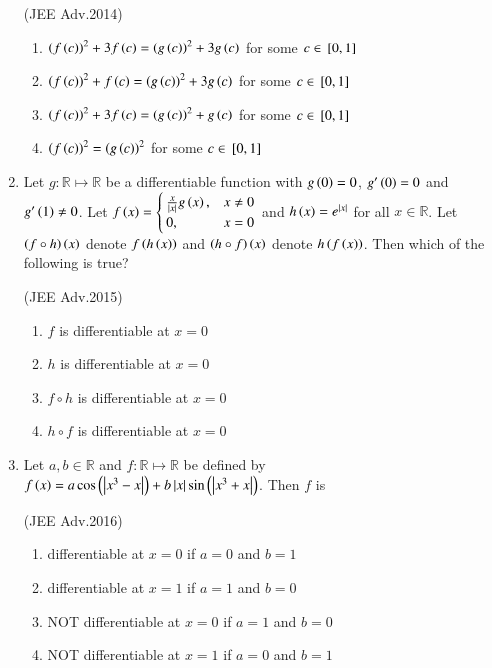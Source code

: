 \documentclass[journal]{IEEEtran}
\numberwithin{equation}{enumi}
\numberwithin{figure}{enumi}
\begin{document}
\begin{enumerate}
    \hfill(JEE Adv.2014)
    
    \begin{enumerate}
        \item ${\left(f\left(c\right)\right)}^2+3f\left(c\right)={\left(g\left(c\right)\right)}^2+3g\left(c\right)$ for some $c\in {}\left[0,1\right]$
        \item ${\left(f\left(c\right)\right)}^2+f\left(c\right)={\left(g\left(c\right)\right)}^2+3g\left(c\right)$ for some $c\in {}\left[0,1\right]$
        \item ${\left(f\left(c\right)\right)}^2+3f\left(c\right)={\left(g\left(c\right)\right)}^2+g\left(c\right)$ for some $c\in {}\left[0,1\right]$
        \item ${\left(f\left(c\right)\right)}^2={\left(g\left(c\right)\right)}^2$ for some $c\in {}\left[0,1\right]$ 
    \end{enumerate}


    \item 
	    Let $g: \mathbb{R}\mapsto \mathbb{R}$ be a differentiable function with $g\left(0\right)=0$, $g^{\prime}\left(0\right)=0$ and $g^{\prime}\left(1\right)\neq 0$. Let $f\left(x\right)=
        \begin{cases}
		\frac{x}{\left\vert x\right\vert}g\left(x\right), & x\neq 0 \\
            0, & x=0
        \end{cases}$ 
	and $h\left(x\right)=e^{\left\vert x\right\vert}$ for all $x\in \mathbb{R}$. Let $\left(f\circ h\right)\left(x\right)$ denote $f\left(h\left(x\right)\right)$ and $\left(h\circ f\right)\left(x\right)$ denote $h\left(f\left(x\right)\right)$. Then which of the following is true? 

    \hfill(JEE Adv.2015)
    
    \begin{enumerate}        
        \item $f$ is differentiable at $x=0$ 
        \item $h$ is differentiable at $x=0$ 
        \item $f\circ h$ is differentiable at $x=0$ 
        \item $h\circ f$ is differentiable at $x=0$  
    \end{enumerate}


    \item 
	    Let $a, b\in \mathbb{R}$ and $f: \mathbb{R}\mapsto \mathbb{R}$ be defined by $f\left(x\right)=a\cos \left(\left\vert x^3-x\right\vert\right) +b\left\vert x\right\vert\sin \left(\left\vert x^3+x\right\vert\right)$. Then $f$ is 
   
    \hfill(JEE Adv.2016)
    
    \begin{enumerate}
        \item differentiable at $x=0$ if $a=0$ and $b=1$
        \item differentiable at $x=1$ if $a=1$ and $b=0$
        \item {NOT} differentiable at $x=0$ if $a=1$ and $b=0$
        \item {NOT} differentiable at $x=1$ if $a=0$ and $b=1$
    \end{enumerate}



\end{enumerate}
\end{document}
